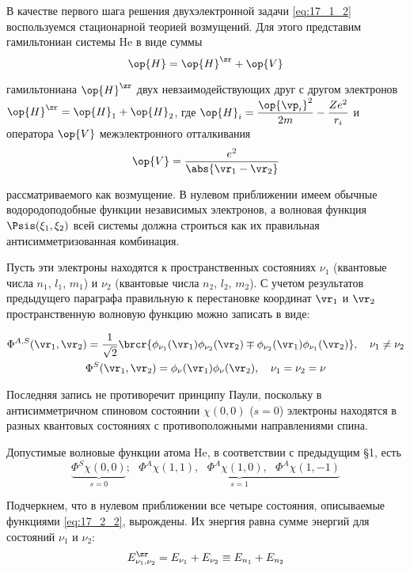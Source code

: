 В качестве первого шага решения двухэлектронной задачи \eqref{eq:17_1_2} воспользуемся стационарной теорией возмущений. Для этого представим гамильтониан системы He в виде суммы
$$
\op{H} = \op{H}^\zr + \op{V}
$$

гамильтониана $\op{H}^\zr$ двух невзаимодействующих друг с другом электронов $\op{H}^\zr = \op{H}_1 + \op{H}_2$, где $\op{H}_i = \dfrac{\op{\vp_i}^2}{2m} - \dfrac{Ze^2}{r_i}$ и оператора $\op{V}$ межэлектронного отталкивания
$$
\op{V} = \frac{e^2}{\abs{\vr_1 - \vr_2}}
$$

рассматриваемого как возмущение. В нулевом приближении имеем обычные водородоподобные функции независимых электронов, а волновая функция $\Psis(\xi_1, \xi_2)$ всей системы должна строиться как их правильная антисимметризованная комбинация.

Пусть эти электроны находятся к пространственных состояниях $\nu_1$ (квантовые числа $n_1$, $l_1$, $m_1$) и $\nu_2$ (квантовые числа $n_2$, $l_2$, $m_2$). С учетом результатов предыдущего параграфа правильную к перестановке координат $\vr_1$ и $\vr_2$ пространственную волновую функцию можно записать в виде:



\begin{gather}
\label{eq:17_2_1}
\Phi^{A, S}(\vr_1, \vr_2) = \frac{1}{\sqrt{2}}\brcr{\phi_{\nu_1}(\vr_1) \phi_{\nu_2}(\vr_2) \mp \phi_{\nu_2}(\vr_1) \phi_{\nu_1}(\vr_2)}, ~~~\nu_1 \neq \nu_2 \nonumber \\
\Phi^S(\vr_1, \vr_2) = \phi_{\nu}(\vr_1) \phi_{\nu}(\vr_2), ~~~\nu_1 = \nu_2= \nu
\end{gather}

Последняя запись не противоречит принципу Паули, поскольку в антисимметричном спиновом состоянии $\chi(0, 0)$ ($s=0$) электроны находятся в разных квантовых состояниях с противоположными направлениями спина.

Допустимые волновые функции атома He, в соответствии с предыдущим \S 1, есть
\begin{equation}
\label{eq:17_2_2}
\underbrace{\Phi^S \chi(0, 0)}_{s = 0};~~~\underbrace{\Phi^A \chi(1,1),~~~\Phi^A \chi(1,0),~~~\Phi^A \chi(1,-1)}_{s = 1}
\end{equation}

Подчеркнем, что в нулевом приближении все четыре состояния, описываемые функциями \eqref{eq:17_2_2}, вырождены. Их энергия равна сумме энергий для состояний $\nu_1$ и $\nu_2$:
$$
E_{\nu_1, \nu_2}^\zr = E_{\nu_1} + E_{\nu_2} \equiv E_{n_1} + E_{n_2}
$$

